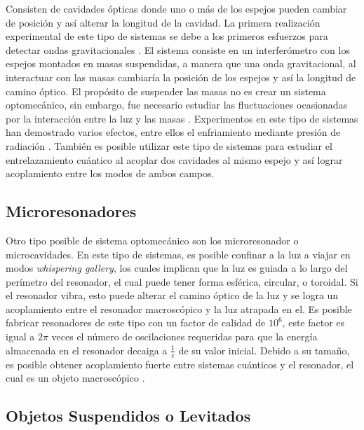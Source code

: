 \documentclass[10pt,a4paper]{report}
\begin{document}
Consisten de cavidades ópticas donde uno o más de los espejos pueden
cambiar de posición y así alterar la longitud de la cavidad. La
primera realización experimental de este tipo de sistemas se debe a
los primeros esfuerzos para detectar ondas gravitacionales
\cite{AbramoviciLIGO}. El sistema consiste en un interferómetro con
los espejos montados en masas suspendidas, a manera que una onda
gravitacional, al interactuar con las masas cambiaría la posición de
los espejos y así la longitud de camino óptico. El propósito de
suspender las masas no es crear un sistema optomecánico, sin embargo,
fue necesario estudiar las fluctuaciones ocasionadas por la
interacción entre la luz y las masas \cite{CavesIF}. Experimentos en
este tipo de sistemas han demostrado varios efectos, entre ellos el
enfriamiento mediante presión de radiación \cite{CorbittOC}. También
es posible utilizar este tipo de sistemas para estudiar el
entrelazamiento cuántico\cite{ChenED} al acoplar dos cavidades al
mismo espejo y así lograr acoplamiento entre los modos de ambos
campos.

\subsection{Microresonadores}

Otro tipo posible de sistema optomecánico son los
microresonador o microcavidades. En este tipo de sistemas, es posible
confinar a la luz a viajar en modos \textit{whispering gallery}, los
cuales implican que la luz es guiada a lo largo del perímetro del
resonador, el cual puede tener forma esférica, circular, o
toroidal\cite{VahalaOM}. Si el resonador vibra, esto puede alterar el camino óptico de la luz y
se logra un acoplamiento entre el resonador macroscópico y la luz atrapada en el. Es posible fabricar resonadores de este tipo con un factor de calidad de $10^6$, este factor es igual a $2\pi$ veces el número de oscilaciones requeridas para que la energía almacenada en el resonador decaiga a $\frac{1}{e}$ de su valor inicial. Debido a su tamaño, es posible obtener acoplamiento fuerte entre sistemas cuánticos y el
resonador, el cual es un objeto macroscópico \cite{VerhagenMOC}.

\subsection{Objetos Suspendidos o Levitados}
\end{document}
